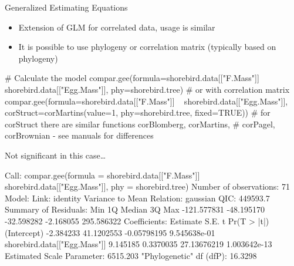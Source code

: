 \documentclass[compress, xelatex, 11pt, xcolor=svgnames, aspectratio=169,
	hyperref={
		bookmarks=true,
		unicode=true,
		colorlinks=true,
		pdftitle={Molecular data in R},
		plainpages=false,
		pdfauthor={Vojtech Zeisek},
		pdfsubject={Course about phylogeny and evolution in R},
		pdfcreator={XeLaTeX},
		pdfkeywords={R, evolution, phylogeny, molecular data},
		linkcolor=Crimson, %
		anchorcolor=Magenta, %
		citecolor=Magenta, %
		filecolor=Magenta, %
		menucolor=Magenta, %
		urlcolor=DodgerBlue, %
		},
	url={hyphens, lowtilde} %
	]{beamer}
\begin{document}
\begin{frame}[fragile]{Generalized Estimating Equations}
	\begin{itemize}
		\item Extension of GLM for correlated data, usage is similar
		\item It is possible to use phylogeny or correlation matrix (typically based on phylogeny)
	\end{itemize}
	\vfil
	\begin{spluscode}
    # Calculate the model
    compar.gee(formula=shorebird.data[["F.Mass"]] ~
      shorebird.data[["Egg.Mass"]], phy=shorebird.tree)
    # or with correlation matrix
    compar.gee(formula=shorebird.data[["F.Mass"]] ~
      shorebird.data[["Egg.Mass"]], corStruct=corMartins(value=1,
      phy=shorebird.tree, fixed=TRUE))
    # for corStruct there are similar functions corBlomberg, corMartins,
    # corPagel, corBrownian - see manuals for differences
	\end{spluscode}
\end{frame}

\begin{frame}[fragile]{Not significant in this case\ldots}
	\begin{spluscode}
    Call: compar.gee(formula = shorebird.data[["F.Mass"]] ~
      shorebird.data[["Egg.Mass"]], phy = shorebird.tree)
    Number of observations:  71 
    Model:
                          Link: identity 
     Variance to Mean Relation: gaussian 
    QIC: 449593.7 
    Summary of Residuals:
            Min          1Q      Median          3Q         Max 
    -121.577831  -48.195170  -32.598282   -2.168055  295.586322 
    Coefficients:
                                  Estimate       S.E.           t  Pr(T > |t|)
    (Intercept)                  -2.384233 41.1202553 -0.05798195 9.545638e-01
    shorebird.data[["Egg.Mass"]]  9.145185  0.3370035 27.13676219 1.003642e-13
    Estimated Scale Parameter:  6515.203
    "Phylogenetic" df (dfP):  16.3298 
	\end{spluscode}
\end{frame}

%
%
\end{document}
